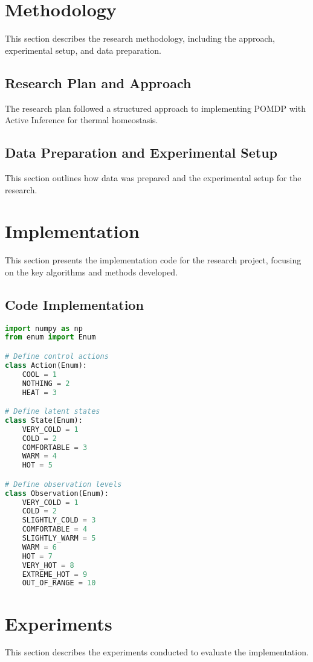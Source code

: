 \documentclass[11pt,a4paper]{article}
\begin{document}
\section{Methodology}
This section describes the research methodology, including the approach, experimental setup, and data preparation.

\subsection{Research Plan and Approach}
The research plan followed a structured approach to implementing POMDP with Active Inference for thermal homeostasis.

\subsection{Data Preparation and Experimental Setup}
This section outlines how data was prepared and the experimental setup for the research.

\section{Implementation}
This section presents the implementation code for the research project, focusing on the key algorithms and methods developed.

\subsection{Code Implementation}

\begin{lstlisting}[language=Python, caption={Implementation code for the POMDP with Active Inference}]
import numpy as np
from enum import Enum

# Define control actions
class Action(Enum):
    COOL = 1
    NOTHING = 2
    HEAT = 3

# Define latent states
class State(Enum):
    VERY_COLD = 1
    COLD = 2
    COMFORTABLE = 3
    WARM = 4
    HOT = 5

# Define observation levels
class Observation(Enum):
    VERY_COLD = 1
    COLD = 2
    SLIGHTLY_COLD = 3
    COMFORTABLE = 4
    SLIGHTLY_WARM = 5
    WARM = 6
    HOT = 7
    VERY_HOT = 8
    EXTREME_HOT = 9
    OUT_OF_RANGE = 10
\end{lstlisting}

\section{Experiments}
This section describes the experiments conducted to evaluate the implementation.
\end{document}
